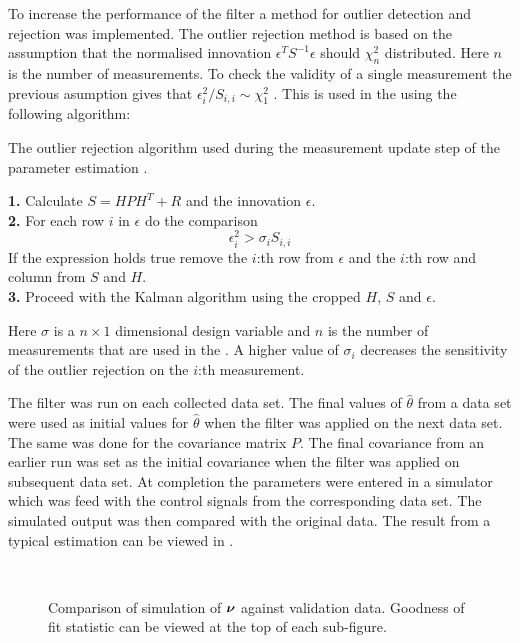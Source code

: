 To increase the performance of the filter a method for outlier detection and rejection was implemented.
The outlier rejection method is based on the assumption that the normalised innovation $\epsilon^T S^{-1} \epsilon$ should $\chi_{n}^{2}$ distributed. Here $n$ is the number of measurements. To check the validity of a single measurement the previous asumption gives that $\epsilon_i^{2}/S_{i,i} \sim \chi_{1}^{2}$ \citep{sensorfusion}. This is used in the \abbrEKF using the following algorithm:
\begin{algorithm}[H]
\label{alg:outlier}
\caption{The outlier rejection algorithm used during the measurement update step of the parameter estimation \abbrEKF.}
\textbf{1.} Calculate $S=H P H^T + R$ and the innovation $\epsilon$.
\\
\textbf{2.} For each row $i$ in $\epsilon$ do the comparison
\begin{equation}
\epsilon_{i}^{2} > \sigma_i S_{i,i}
\end{equation}
If the expression holds true remove the $i$:th row from $\epsilon$ and the $i$:th row and column from $S$ and $H$.\\
\textbf{3.} Proceed with the Kalman algorithm using the cropped $H$, $S$ and $\epsilon$.
\end{algorithm}
Here $\sigma$ is a $n\times1$ dimensional design variable and $n$ is the number of measurements that are used in the \abbrEKF. A higher value of $\sigma_i$ decreases the sensitivity of the outlier rejection on the $i$:th measurement.

The filter was run on each collected data set. The final values of $\hat{\theta}$ from a data set were used as initial values for $\hat{\theta}$ when the filter was applied on the next data set. The same was done for the covariance matrix $P$. The final covariance from an earlier run was set as the initial covariance when the filter was applied on subsequent data set. At completion the parameters were entered in a simulator which was feed with the control signals from the corresponding data set. The simulated  output was then compared with the original data. The result from a typical estimation can be viewed in .
\begin{figure}[tbp]
  \centering
  \qquad
  \\
  \caption{\label{fig:KalmanCompare}%
    Comparison of simulation of $\boldsymbol{\nu}$ against validation data. Goodness of fit statistic can be viewed at the top of each sub-figure.}
\end{figure}



